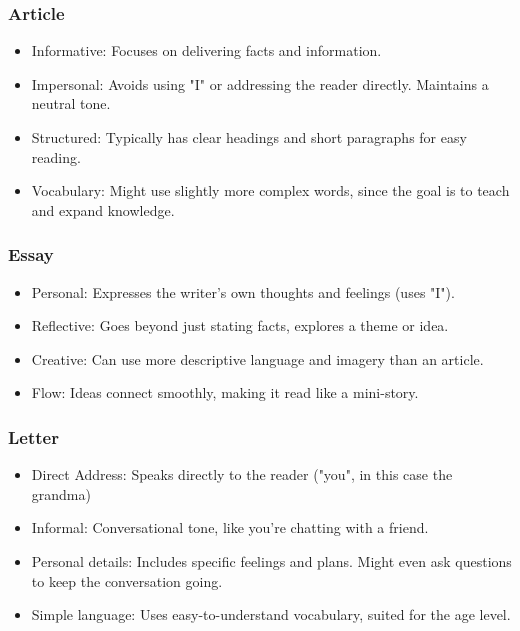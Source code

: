 \documentclass[]{article} %
\begin{document}
	\begin{minipage}[h]{0.9\textwidth}	
		
		\begin{multicols}{2}
			
			
			
			
			\centering
			\subsubsection*{Article}
			
			\begin{itemize}
				\item{Informative: Focuses on delivering facts and information.}
				\item{Impersonal: Avoids using "I" or addressing the reader directly. Maintains a neutral tone.}
				\item{Structured: Typically has clear headings and short paragraphs for easy reading.}
				\item{Vocabulary: Might use slightly more complex words, since the goal is to teach and expand knowledge.}
			\end{itemize}
			
			\subsubsection*{Essay}
			
			\begin{itemize}
				\item{Personal: Expresses the writer's own thoughts and feelings (uses "I").}
				\item{Reflective: Goes beyond just stating facts, explores a theme or idea.}
				\item{Creative: Can use more descriptive language and imagery than an article.}
				\item{Flow: Ideas connect smoothly, making it read like a mini-story.}
			\end{itemize}
			
			\subsubsection*{Letter}
			\begin{itemize}
				\item{Direct Address: Speaks directly to the reader ("you", in this case the grandma)}
				\item{Informal: Conversational tone, like you're chatting with a friend.}
				\item{Personal details: Includes specific feelings and plans. Might even ask questions to keep the conversation going.}
				\item{Simple language: Uses easy-to-understand vocabulary, suited for the age level.}
			\end{itemize}
			
		\end{multicols}
	\end{minipage}
	
\end{document}
